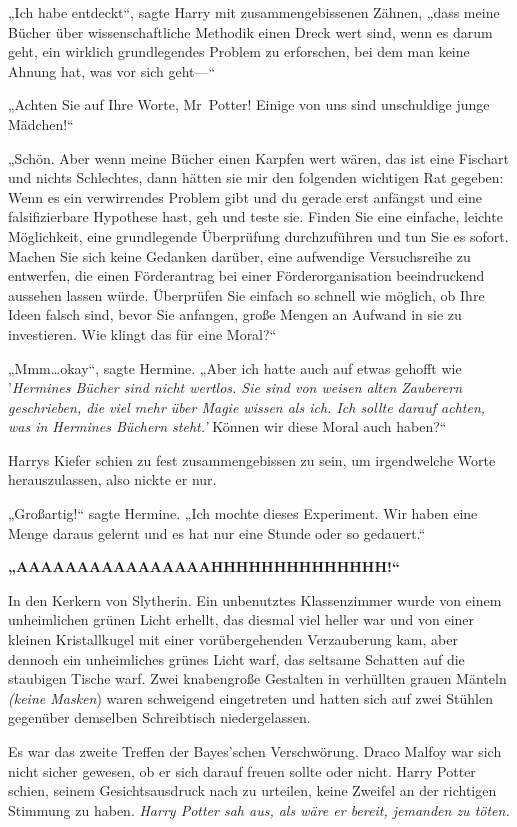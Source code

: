 {„Ich habe entdeckt“, sagte Harry mit zusammengebissenen Zähnen, „dass meine Bücher über wissenschaftliche Methodik einen Dreck wert sind, wenn es darum geht, ein wirklich grundlegendes Problem zu erforschen, bei dem man keine Ahnung hat, was vor sich geht—“

„Achten Sie auf Ihre Worte, Mr~Potter! Einige von uns sind unschuldige junge Mädchen!“

„Schön. Aber wenn meine Bücher einen Karpfen wert wären, das ist eine Fischart und nichts Schlechtes, dann hätten sie mir den folgenden wichtigen Rat gegeben: Wenn es ein verwirrendes Problem gibt und du gerade erst anfängst und eine falsifizierbare Hypothese hast, geh und teste sie. Finden Sie eine einfache, leichte Möglichkeit, eine grundlegende Überprüfung durchzuführen und tun Sie es sofort. Machen Sie sich keine Gedanken darüber, eine aufwendige Versuchsreihe zu entwerfen, die einen Förderantrag bei einer Förderorganisation beeindruckend aussehen lassen würde. Überprüfen Sie einfach so schnell wie möglich, ob Ihre Ideen falsch sind, bevor Sie anfangen, große Mengen an Aufwand in sie zu investieren. Wie klingt das für eine Moral?“

„Mmm…okay“, sagte Hermine. „Aber ich hatte auch auf etwas gehofft wie '\emph{Hermines Bücher sind nicht wertlos. Sie sind von weisen alten Zauberern geschrieben, die viel mehr über Magie wissen als ich. Ich sollte darauf achten, was in Hermines Büchern steht.'} Können wir diese Moral auch haben?“

Harrys Kiefer schien zu fest zusammengebissen zu sein, um irgendwelche Worte herauszulassen, also nickte er nur.

„Großartig!“ sagte Hermine. „Ich mochte dieses Experiment. Wir haben eine Menge daraus gelernt und es hat nur eine Stunde oder so gedauert.“

\textbf{„AAAAAAAAAAAAAAAAHHHHHHHHHHHHHH!“}

In den Kerkern von Slytherin. Ein unbenutztes Klassenzimmer wurde von einem unheimlichen grünen Licht erhellt, das diesmal viel heller war und von einer kleinen Kristallkugel mit einer vorübergehenden Verzauberung kam, aber dennoch ein unheimliches grünes Licht warf, das seltsame Schatten auf die staubigen Tische warf. Zwei knabengroße Gestalten in verhüllten grauen Mänteln \emph{(keine Masken}) waren schweigend eingetreten und hatten sich auf zwei Stühlen gegenüber demselben Schreibtisch niedergelassen.

Es war das zweite Treffen der Bayes'schen Verschwörung. Draco Malfoy war sich nicht sicher gewesen, ob er sich darauf freuen sollte oder nicht. Harry Potter schien, seinem Gesichtsausdruck nach zu urteilen, keine Zweifel an der richtigen Stimmung zu haben. \emph{Harry Potter sah aus, als wäre er bereit, jemanden zu töten.}

}
